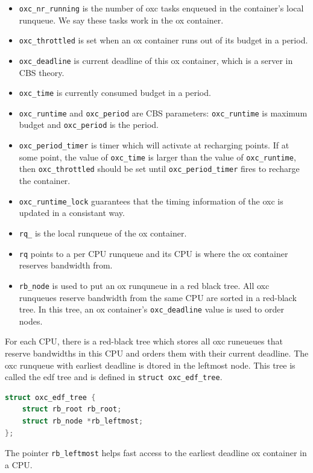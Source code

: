 \begin{itemize}
\item \texttt{oxc\_nr\_running} is the number of oxc tasks enqueued in 
		the container's local runqueue. We say these tasks work 
		in the ox container.
\item \texttt{oxc\_throttled} is set when an ox container runs out of
		its budget in a period.
\item \texttt{oxc\_deadline} is current deadline of this ox container,
		which is a server in CBS theory.
\item \texttt{oxc\_time} is currently consumed budget in a period.
\item \texttt{oxc\_runtime} and \texttt{oxc\_period} are CBS parameters:
		\texttt{oxc\_runtime} is maximum budget and 
		\texttt{oxc\_period} is the period.
\item \texttt{oxc\_period\_timer} is timer which will activate at recharging
		points. If at some point, the value of \texttt{oxc\_time} is 
		larger than the value of \texttt{oxc\_runtime}, then
		\texttt{oxc\_throttled} should be set until 
		\texttt{oxc\_period\_timer} fires to recharge the container.
\item \texttt{oxc\_runtime\_lock} guarantees that the timing information of 
		the oxc is updated in a consistant way.
\item \texttt{rq\_} is the local runqueue of the ox container.
\item \texttt{rq} points to a per CPU runqueue and its CPU is where the 
		ox container reserves bandwidth from.
\item \texttt{rb\_node} is used to put an ox runquneue in a red black tree.
		All oxc runqueues reserve bandwidth from the same CPU
		are sorted in a red-black tree. In this tree, an ox 
		container's \texttt{oxc\_deadline} value is used to order 
		nodes.
\end{itemize}

For each CPU, there is a red-black tree which stores all oxc runeueues that
reserve bandwidths in this CPU and orders them with their current deadline.
The oxc runqueue with earliest deadline is dtored in the leftmost node. 
This tree is called the edf tree and is defined in 
\texttt{struct oxc\_edf\_tree}.
\begin{lstlisting}[language=C, caption={The EDF tree}]
struct oxc_edf_tree {
	struct rb_root rb_root;
	struct rb_node *rb_leftmost;
};
\end{lstlisting}
The pointer \texttt{rb\_leftmost} helps fast access to the earliest deadline
ox container in a CPU.

